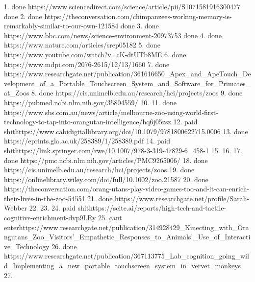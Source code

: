 1.	done https://www.sciencedirect.com/science/article/pii/S1071581916300477 done
2.	done https://theconversation.com/chimpanzees-working-memory-is-remarkably-similar-to-our-own-121584 done
3.	done https://www.bbc.com/news/science-environment-20973753 done
4.	done https://www.nature.com/articles/srep05182
5.	done https://www.youtube.com/watch?v=cK-dtUTb8ME 
6.	done https://www.mdpi.com/2076-2615/12/13/1660   
7.	done https://www.researchgate.net/publication/361616650_Apex_and_ApeTouch_Development_of_a_Portable_Touchscreen_System_and_Software_for_Primates_at_Zoos
8.	done https://cis.unimelb.edu.au/research/hci/projects/zoos
9.	done https://pubmed.ncbi.nlm.nih.gov/35804559/
10.	
11.	done https://www.sbs.com.au/news/article/melbourne-zoo-using-world-first-technology-to-tap-into-orangutan-intelligence/hq6j05zsz
12.	paid shithttps://www.cabidigitallibrary.org/doi/10.1079/9781800622715.0006
13.	done https://eprints.gla.ac.uk/258389/1/258389.pdf
14.	paid shithttps://link.springer.com/rwe/10.1007/978-3-319-47829-6_458-1
15.	
16.	
17.	done https://pmc.ncbi.nlm.nih.gov/articles/PMC9265006/
18.	done https://cis.unimelb.edu.au/research/hci/projects/zoos
19.	done https://onlinelibrary.wiley.com/doi/full/10.1002/zoo.21587
20.	done https://theconversation.com/orang-utans-play-video-games-too-and-it-can-enrich-their-lives-in-the-zoo-54551
21.	done https://www.researchgate.net/profile/Sarah-Webber
22.	
23.	
24.	paid shithttps://scite.ai/reports/high-tech-and-tactile-cognitive-enrichment-dvp9LRy
25.	cant enterhttps://www.researchgate.net/publication/314928429_Kinecting_with_Orangutans_Zoo_Visitors'_Empathetic_Responses_to_Animals'_Use_of_Interactive_Technology
26.	done https://www.researchgate.net/publication/367113775_Lab_cognition_going_wild_Implementing_a_new_portable_touchscreen_system_in_vervet_monkeys
27.		
